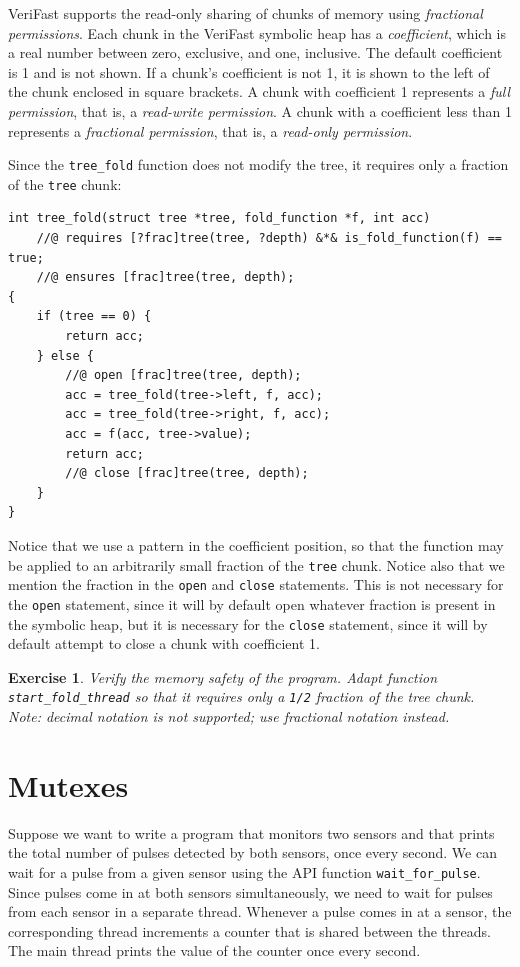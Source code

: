 \documentclass{article}
\newtheorem{exercise}{Exercise}
\begin{document}
VeriFast supports the read-only sharing of chunks of memory
using \emph{fractional permissions}. Each chunk in the VeriFast
symbolic heap has a \emph{coefficient}, which is a real number
between zero, exclusive, and one, inclusive. The default
coefficient is 1 and is not shown. If a chunk's coefficient is
not 1, it is shown to the left of the chunk enclosed in square
brackets. A chunk with coefficient 1 represents a \emph{full
permission}, that is, a \emph{read-write permission}. A chunk
with a coefficient less than 1 represents a \emph{fractional
permission}, that is, a \emph{read-only permission}.

Since the \lstinline!tree_fold! function does not modify the
tree, it requires only a fraction of the \lstinline!tree!
chunk:
\begin{lstlisting}
int tree_fold(struct tree *tree, fold_function *f, int acc)
    //@ requires [?frac]tree(tree, ?depth) &*& is_fold_function(f) == true;
    //@ ensures [frac]tree(tree, depth);
{
    if (tree == 0) {
        return acc;
    } else {
        //@ open [frac]tree(tree, depth);
        acc = tree_fold(tree->left, f, acc);
        acc = tree_fold(tree->right, f, acc);
        acc = f(acc, tree->value);
        return acc;
        //@ close [frac]tree(tree, depth);
    }
}
\end{lstlisting}
Notice that we use a pattern in the coefficient position, so
that the function may be applied to an arbitrarily small
fraction of the \lstinline!tree! chunk. Notice also that we
mention the fraction in the \lstinline!open! and
\lstinline!close! statements. This is not necessary for the
\lstinline!open! statement, since it will by default open
whatever fraction is present in the symbolic heap, but it is
necessary for the \lstinline!close! statement, since it will by
default attempt to close a chunk with coefficient 1.

\begin{exercise}\label{exercise:fractions}
Verify the memory safety of the program. Adapt function
\lstinline!start_fold_thread! so that it requires only a
\lstinline!1/2! fraction of the tree chunk. Note: decimal
notation is not supported; use fractional notation instead.
\end{exercise}

\section{Mutexes}\label{section:mutexes}

Suppose we want to write a program that monitors two sensors
and that prints the total number of pulses detected by both
sensors, once every second. We can wait for a pulse from a
given sensor using the API function \lstinline!wait_for_pulse!.
Since pulses come in at both sensors simultaneously, we need to
wait for pulses from each sensor in a separate thread. Whenever
a pulse comes in at a sensor, the corresponding thread
increments a counter that is shared between the threads. The
main thread prints the value of the counter once every second.
\end{document}
